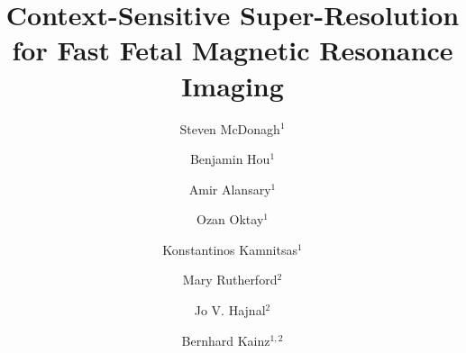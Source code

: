 \documentclass[runningheads,a4paper]{llncs}
\begin{document}
\mainmatter  %

\title{Context-Sensitive Super-Resolution for Fast Fetal Magnetic Resonance Imaging}


\author{Steven McDonagh$^{1}$ \and Benjamin Hou$^{1}$ \and Amir Alansary$^1$ \and Ozan Oktay$^1$ \and Konstantinos Kamnitsas$^1$ \and Mary Rutherford$^2$ \and Jo V. Hajnal$^2$ \and Bernhard Kainz$^{1,2}$}
%


%

\maketitle
\end{document}
